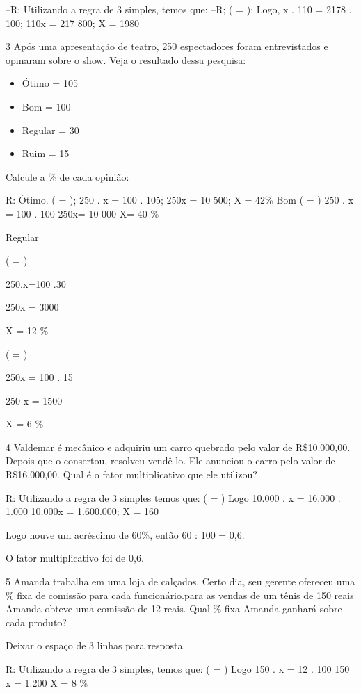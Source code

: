 {--R: Utilizando a regra de 3 simples, temos que:
--R; ( = ); Logo, x . 110 = 2178 . 100; 110x = 217 800; X = 1980

\num{3} Após uma apresentação de teatro, 250 espectadores foram entrevistados
e opinaram sobre o show. Veja o resultado dessa pesquisa:

\begin{itemize}
\item
  Ótimo = 105
\item
  Bom = 100
\item
  Regular = 30
\item
  Ruim = 15
\end{itemize}

Calcule a \% de cada opinião:

R: Ótimo. ( = ); 250 . x = 100 . 105; 250x = 10 500; X = 42\%
Bom
( = )
250 . x = 100 . 100
250x= 10 000
X= 40 \%

Regular

( = )

250.x=100 .30

250x = 3000

X = 12 \%

( = )

250x = 100 . 15

250 x = 1500

X = 6 \%

\num{4} Valdemar é mecânico e adquiriu um carro quebrado pelo valor de
R\$10.000,00. Depois que o consertou, resolveu vendê-lo. Ele anunciou o
carro pelo valor de R\$16.000,00. Qual é o fator multiplicativo que ele
utilizou?

R: Utilizando a regra de 3 simples temos que:
( = )
Logo 10.000 . x = 16.000 . 1.000
10.000x = 1.600.000; X = 160

Logo houve um acréscimo de 60\%, então 60 : 100 = 0,6.

O fator multiplicativo foi de 0,6.

\num{5} Amanda trabalha em uma loja de calçados. Certo dia, seu gerente
ofereceu uma \% fixa de comissão para cada funcionário.para as vendas de
um tênis de 150 reais Amanda obteve uma comissão de 12 reais. Qual \%
fixa Amanda ganhará sobre cada produto?

Deixar o espaço de 3 linhas para resposta.

R: Utilizando a regra de 3 simples, temos que:
( = )
Logo 150 . x = 12 . 100
150 x = 1.200
X = 8 \%

}
